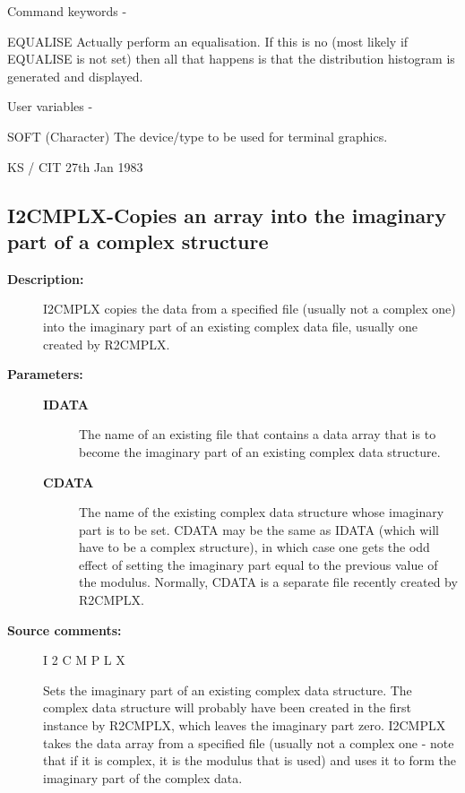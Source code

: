 \begin{description}
\begin{description}
\begin{terminalv}
 Command keywords -

 EQUALISE  Actually perform an equalisation.  If this is
           no (most likely if EQUALISE is not set) then
           all that happens is that the distribution
           histogram is generated and displayed.

 User variables -

 SOFT    (Character) The device/type to be used for terminal
         graphics.

                                  KS / CIT 27th Jan 1983
\end{terminalv}
\end{description}
\subsection{I2CMPLX-\label{I2CMPLX}Copies an array into the imaginary part of a complex structure}
\begin{description}

\item [\textbf{Description:}]
 I2CMPLX copies the data from a specified file (usually not a
 complex one) into the imaginary part of an existing complex data
 file, usually one created by R2CMPLX.

\item [\textbf{Parameters:}]
\begin{description}
\item [\textbf{IDATA}]
 The name of an existing file that contains a data
 array that is to become the imaginary part of an
 existing complex data structure.
\item [\textbf{CDATA}]
 The name of the existing complex data structure
 whose imaginary part is to be set. CDATA may be the same
 as IDATA (which will have to be a complex structure), in
 which case one gets the odd effect of setting the imaginary
 part equal to the previous value of the modulus.  Normally,
 CDATA is a separate file recently created by R2CMPLX.
\end{description}

\item [\textbf{Source comments:}]
\begin{terminalv}
 I 2 C M P L X

 Sets the imaginary part of an existing complex data structure.
 The complex data structure will probably have been created in the
 first instance by R2CMPLX, which leaves the imaginary part zero.
 I2CMPLX takes the data array from a specified file (usually not a
 complex one - note that if it is complex, it is the modulus that
 is used) and uses it to form the imaginary part of the complex
 data.


\end{terminalv}
\end{description}
\end{description}
